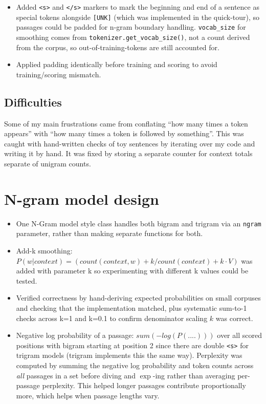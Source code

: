 \documentclass[11pt]{article}
\begin{document}
\begin{itemize}
	\item
	      Added \texttt{<s>} and \texttt{</s>} markers to mark the beginning and end of a sentence as special tokens alongside \texttt{[UNK]} (which was implemented in the quick-tour), so passages could be padded for n-gram boundary handling.
	      \texttt{vocab\_size} for smoothing comes from \texttt{tokenizer.get\_vocab\_size()}, not a count derived from the corpus, so out-of-training-tokens are still accounted for.
	\item
	      Applied padding identically before training and scoring to avoid training/scoring mismatch.
\end{itemize}

\subsection{Difficulties}

Some of my main frustrations came from conflating ``how many times a token appears'' with ``how many times a token is followed by something''. This was caught with hand-written checks of toy sentences by iterating over my code and writing it by hand. It was fixed by storing a separate counter for context totals separate of unigram counts.

\section{N-gram model design}

\begin{itemize}
  \item
        One N-Gram model style class handles both bigram and trigram via an \texttt{ngram} parameter, rather than making separate functions for both.
  \item
        Add-k smoothing: $P(w|context) = (count(context, w)+k/count(context)+ k \cdot V)$ was added with parameter k so experimenting with different k values could be tested.
  \item
        Verified correctness by hand-deriving expected probabilities on small corpuses and checking that the implementation matched, plus systematic sum-to-1 checks across k=1 and k=0.1 to confirm denominator scaling $k$ was correct.
  \item
        Negative log probability of a passage: $sum(-log(P(....)))$ over all scored positions with bigram starting at position 2 since there are double \texttt{<s>} for trigram models (trigram implements this the same way). Perplexity was computed by summing the negative log probability and token counts across \textit{all} passages in a set before diving and $\exp$-ing rather than averaging per-passage perplexity. This helped longer passages contribute proportionally more, which helps when passage lengths vary.
\end{itemize}
\end{document}
